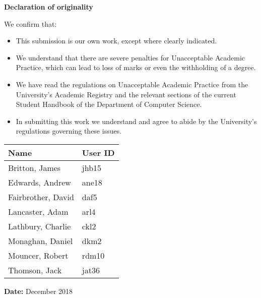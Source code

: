 \thispagestyle{empty}


\begin{center}
    {\LARGE\bf Declaration of originality}
\end{center}

We confirm that:

\begin{itemize}
\item{This submission is our own work, except where 
clearly indicated.}

\item{We understand that there are severe penalties for Unacceptable Academic Practice, which can lead to loss of marks or even the withholding of a degree.}
 
\item{We have read the regulations on Unacceptable Academic Practice from the University's Academic Registry and the relevant sections of the current Student Handbook of the Department of Computer Science.}
 
\item{In submitting this work we understand and agree to abide by the University's regulations governing these issues.}

\end{itemize}


\begin{tabular}{|l|l|}
\hline
\textbf{Name} & \textbf{User ID} \\
\hline  
  Britton, James  	 	&  jhb15 \\
  Edwards, Andrew  		&  ane18 \\
  Fairbrother, David    &  daf5  \\
  Lancaster, Adam 		&  arl4  \\
  Lathbury, Charlie		&  ckl2  \\
  Monaghan, Daniel		&  dkm2  \\
  Mouncer, Robert		&  rdm10 \\
  Thomson, Jack			&  jat36 \\
\hline       
\end{tabular}

\vspace{1em}
\textbf{Date:} December 2018 \\


